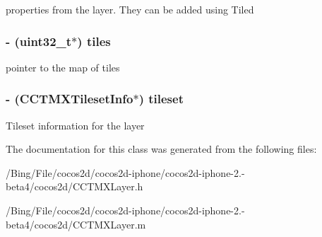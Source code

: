 properties from the layer. They can be added using Tiled \hypertarget{interface_c_c_t_m_x_layer_a37c6ea184edaec1b0ba8f82cf2c386c8}{
\subsubsection[{tiles}]{\setlength{\rightskip}{0pt plus 5cm}-\/ (uint32\-\_\-t$\ast$) {\bf tiles}}}\label{interface_c_c_t_m_x_layer_a37c6ea184edaec1b0ba8f82cf2c386c8}
pointer to the map of tiles \hypertarget{interface_c_c_t_m_x_layer_afb0c60d744928f1ebbe66010448cdcce}{
\subsubsection[{tileset}]{\setlength{\rightskip}{0pt plus 5cm}-\/ ({\bf C\-C\-T\-M\-X\-Tileset\-Info}$\ast$) {\bf tileset}}}\label{interface_c_c_t_m_x_layer_afb0c60d744928f1ebbe66010448cdcce}
Tileset information for the layer 

The documentation for this class was generated from the following files\-:\begin{DoxyCompactItemize}
\item 
/\-Bing/\-File/cocos2d/cocos2d-\/iphone/cocos2d-\/iphone-\/2.-\/beta4/cocos2d/C\-C\-T\-M\-X\-Layer.\-h\item 
/\-Bing/\-File/cocos2d/cocos2d-\/iphone/cocos2d-\/iphone-\/2.-\/beta4/cocos2d/C\-C\-T\-M\-X\-Layer.\-m\end{DoxyCompactItemize}
